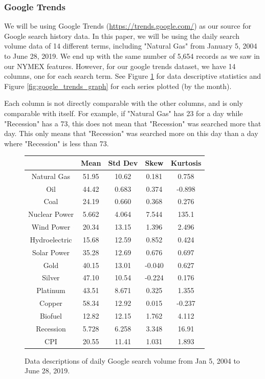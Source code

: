 \documentclass[final]{cvpr}
\begin{document}
\subsubsection{Google Trends}

    We will be using Google Trends (\url{https://trends.google.com/}) as our
    source for Google search history data.  In this paper, we will be using the
    daily search volume data of 14 different terms, including "Natural Gas" from
    January 5, 2004 to June 28, 2019. We end up with the same number of 5,654
    records as we saw in our NYMEX features. However, for our google trends
    dataset, we have 14 columns, one for each search term. See Figure 
    \ref{fig:google_trends_desc} for data descriptive statistics and Figure 
    \ref{fig:google_trends_graph} for each series plotted (by the month). 
    
    Each column is not directly comparable with the other columns, and is only
    comparable with itself. For example, if "Natural Gas" has 23 for a day while
    "Recession" has a 73, this does not mean that "Recession" was searched more
    that day. This only means that "Recession" was searched more on this day
    than a day where "Recession" is less than 73.

    \begin{figure}[h]
        \caption{Data descriptions of daily Google search volume from Jan 5, 
            2004 to June 28, 2019.} 
        \center
        \begin{tabular}{| c || c | c | c | c |}
            \hline 
            & Mean & Std Dev & Skew & Kurtosis\\ 
            \hline
            \hline
            Natural Gas   & 51.95 & 10.62 &  0.181 &  0.758\\
            Oil           & 44.42 & 0.683 &  0.374 & -0.898\\
            Coal          & 24.19 & 0.660 &  0.368 &  0.276\\
            Nuclear Power & 5.662 & 4.064 &  7.544 &  135.1\\
            Wind Power    & 20.34 & 13.15 &  1.396 &  2.496\\
            Hydroelectric & 15.68 & 12.59 &  0.852 &  0.424\\
            Solar Power   & 35.28 & 12.69 &  0.676 &  0.697\\
            Gold          & 40.15 & 13.01 & -0.040 &  0.627\\
            Silver        & 47.10 & 10.54 & -0.224 &  0.176\\
            Platinum      & 43.51 & 8.671 &  0.325 &  1.355\\
            Copper        & 58.34 & 12.92 &  0.015 & -0.237\\
            Biofuel       & 12.82 & 12.15 &  1.762 &  4.112\\
            Recession     & 5.728 & 6.258 &  3.348 &  16.91\\
            CPI           & 20.55 & 11.41 &  1.031 &  1.893\\
            \hline
        \end{tabular}
        \label{fig:google_trends_desc}
    \end{figure}
\end{document}
